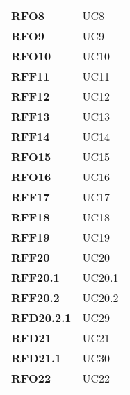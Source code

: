 \begin{longtable}[H]{>{\centering\bfseries}m{8cm} >{\centering\arraybackslash}m{8cm}}
  \textbf{RFO8} & UC8 \\
  \textbf{RFO9} & UC9 \\
  \textbf{RFO10} & UC10 \\
  \textbf{RFF11} & UC11 \\
  \textbf{RFF12} & UC12 \\
  \textbf{RFF13} & UC13 \\
  \textbf{RFF14} & UC14 \\
  \textbf{RFO15} & UC15 \\
  \textbf{RFO16} & UC16 \\
  \textbf{RFF17} & UC17 \\
  \textbf{RFF18} & UC18 \\
  \textbf{RFF19} & UC19 \\
  \textbf{RFF20} & UC20 \\
  \textbf{RFF20.1} & UC20.1 \\
  \textbf{RFF20.2} & UC20.2 \\
  \textbf{RFD20.2.1} & UC29 \\
  \textbf{RFD21} & UC21 \\
  \textbf{RFD21.1} & UC30 \\
  \textbf{RFO22} & UC22 \\

\end{longtable}
